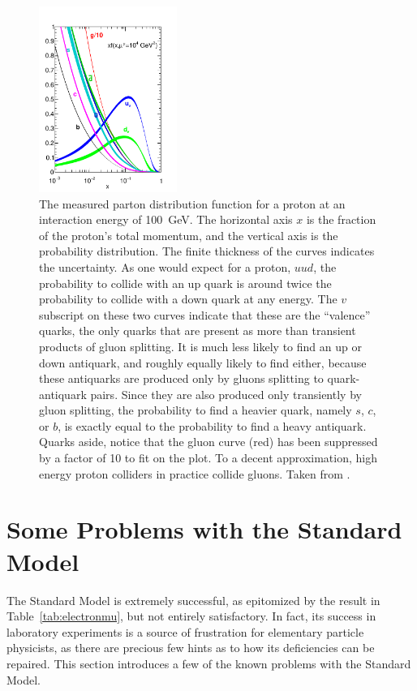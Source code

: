   \begin{figure}[h!]
    \centering
    \includegraphics[width=0.4\textwidth]{figures/parton_distribution_function.pdf}
    \caption[Proton parton distribution function.]{
      The measured parton distribution function for a proton at an interaction energy of 100~GeV.
      The horizontal axis $x$ is the fraction of the proton's total momentum, and the vertical axis is the probability distribution.
      The finite thickness of the curves indicates the uncertainty.
      As one would expect for a proton, $uud$, the probability to collide with an up quark is around twice the probability to collide with a down quark at any energy.
      The $v$ subscript on these two curves indicate that these are the ``valence'' quarks, the only quarks that are present as more than transient products of gluon splitting.
      It is much less likely to find an up or down antiquark, and roughly equally likely to find either, because these antiquarks are produced only by gluons splitting to quark-antiquark pairs.
      Since they are also produced only transiently by gluon splitting, the probability to find a heavier quark, namely $s$, $c$, or $b$, is exactly equal to the probability to find a heavy antiquark.
      Quarks aside, notice that the gluon curve (red) has been suppressed by a factor of 10 to fit on the plot.
      To a decent approximation, high energy proton colliders in practice collide gluons.
      Taken from \cite{PDFs}.}
    \label{fig:PDF}
  \end{figure}  


\section{Some Problems with the Standard Model} \label{sec:SMproblems}

The Standard Model is extremely successful, as epitomized by the result in Table~\ref{tab:electronmu}, but not entirely satisfactory.
In fact, its success in laboratory experiments is a source of frustration for elementary particle physicists, as there are precious few hints as to how its deficiencies can be repaired.
This section introduces a few of the known problems with the Standard Model.

